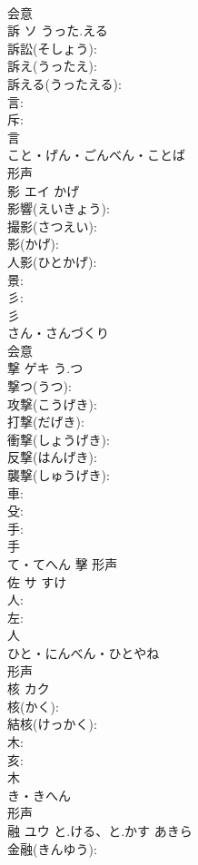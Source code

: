 \documentclass[8pt]{extreport}
\begin{document}
\begin{CJK}{UTF8}{min}
\\	会意 
\\	訴	ソ	うった.える		
\\	訴訟(そしょう): 
\\	訴え(うったえ): 
\\	訴える(うったえる): 
\\	言: 
\\	斥: 
\\	言	
\\	こと・げん・ごんべん・ことば	
\\	形声 
\\	影	エイ	かげ		
\\	影響(えいきょう): 
\\	撮影(さつえい): 
\\	影(かげ): 
\\	人影(ひとかげ): 
\\	景: 
\\	彡: 
\\	彡	
\\	さん・さんづくり	
\\	会意 
\\	撃	ゲキ	う.つ		
\\	撃つ(うつ): 
\\	攻撃(こうげき): 
\\	打撃(だげき): 
\\	衝撃(しょうげき): 
\\	反撃(はんげき): 
\\	襲撃(しゅうげき): 
\\	車: 
\\	殳: 
\\	手: 
\\	手	
\\	て・てへん	擊	形声 
\\	佐	サ		すけ	
\\	人: 
\\	左: 
\\	人	
\\	ひと・にんべん・ひとやね	
\\	形声 
\\	核	カク			
\\	核(かく): 
\\	結核(けっかく): 
\\	木: 
\\	亥: 
\\	木	
\\	き・きへん	
\\	形声 
\\	融	ユウ	と.ける、と.かす	あきら	
\\	金融(きんゆう): 

\end{CJK}
\end{document}
